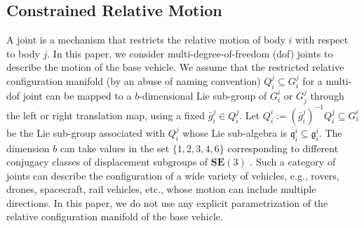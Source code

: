 \documentclass[lettersize,journal]{IEEEtran}
\def \SE {\textbf{SE}(3)}
\def \g  {\mathfrak{g}}
\theoremstyle{remark}
\begin{document}
\subsection{Constrained Relative Motion}
A joint is a mechanism that restricts the relative motion of body $i$ with respect to body $j$. %
In this paper, we consider multi-degree-of-freedom (dof) joints to describe the motion of the base vehicle. We assume that the restricted relative configuration manifold (by an abuse of naming convention) $Q^j_i\subseteq G_i^j$ for a multi-dof joint can be mapped to a $b$-dimensional Lie sub-group of $G^i_i$ or $G^j_j$ through the left or right translation map, using a fixed $\bar{g}^j_i \in Q^j_i$. Let $Q_i^i:=(\bar{g}_i^j)^{-1}Q^j_i\subseteq G_i^i$ be the Lie sub-group associated with $Q_i^j$ whose Lie  sub-algebra is $\mathfrak{q}_i^i\subseteq \g_i^i$.  The dimension $b$ can take values in the set $\{1,2,3,4,6\}$ corresponding to different conjugacy classes of displacement subgroups of $\SE$ \cite{Chhabra2014a}. Such a category of joints can describe the configuration of a wide variety of vehicles, e.g., rovers, drones, spacecraft, rail vehicles, etc., whose motion can include multiple directions. In this paper, we do not use any explicit parametrization of the relative configuration manifold of the base vehicle.
\end{document}

